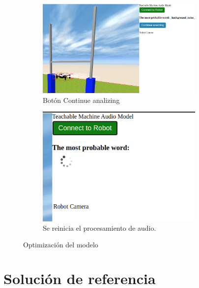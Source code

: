 \begin{figure}[H]
  \begin{subfigure}[b]{0.5\textwidth}
  \centering
    \includegraphics[width=0.9\textwidth, height=0.65\textwidth]{chapters/images/optimizacionaudio.png}
    \caption{Botón Continue analizing }
    \label{fig:f1}
  \end{subfigure}
  \hfill
  \begin{subfigure}[b]{0.5\textwidth}
  \centering
    \includegraphics[width=0.9\textwidth, height=0.65\textwidth]{chapters/images/optimizacionaudio2.png}
	\caption{Se reinicia el procesamiento de audio.}    
    \label{fig:f2}
 
  \end{subfigure}
  \caption{Optimización del modelo }
\end{figure}


\section{Solución de referencia}

